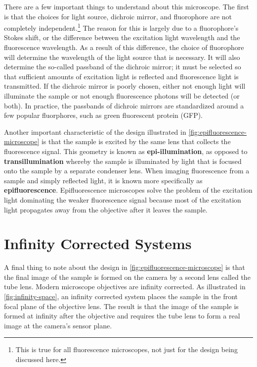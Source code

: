 \documentclass[10pt,a4paper]{book}
\begin{document}
There are a few important things to understand about this microscope. The first is that the choices for light source, dichroic mirror, and fluorophore are not completely independent.\footnote{This is true for all fluorescence microscopes, not just for the design being discussed here.} The reason for this is largely due to a fluorophore's Stokes shift, or the difference between the excitation light wavelength and the fluorescence wavelength. As a result of this difference, the choice of fluorophore will determine the wavelength of the light source that is necessary. It will also determine the so-called passband of the dichroic mirror; it must be selected so that sufficient amounts of excitation light is reflected and fluorescence light is transmitted. If the dichroic mirror is poorly chosen, either not enough light will illuminate the sample or not enough fluorescence photons will be detected (or both). In practice, the passbands of dichroic mirrors are standardized around a few popular fluorphores, such as green fluorescent protein (GFP).

Another important characteristic of the design illustrated in \autoref{fig:epifluorescence-microscope} is that the sample is excited by the same lens that collects the fluorescence signal. This geometry is known as \textbf{epi-illumination}, as opposed to \textbf{transillumination} whereby the sample is illuminated by light that is focused onto the sample by a separate condenser lens. When imaging fluorescence from a sample and simply reflected light, it is known more specifically as \textbf{epifluorescence}. Epifluorescence microscopes solve the problem of the excitation light dominating the weaker fluorescence signal because most of the excitation light propagates away from the objective after it leaves the sample.

\section{Infinity Corrected Systems}

A final thing to note about the design in \autoref{fig:epifluorescence-microscope} is that the final image of the sample is formed on the camera by a second lens called the tube lens. Modern microscope objectives are infinity corrected. As illustrated in \autoref{fig:infinity-space}, an infinity corrected system places the sample in the front focal plane of the objective lens. The result is that the image of the sample is formed at infinity after the objective and requires the tube lens to form a real image at the camera's sensor plane.
\end{document}
